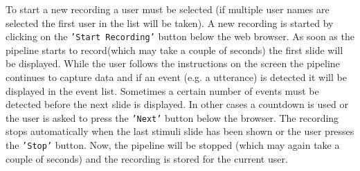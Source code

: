 To start a new recording a user must be selected (if multiple user names are selected the first user in the list will be taken). A new recording is started by clicking on the \texttt{'Start Recording'} button below the web browser. As soon as the pipeline starts to record(which may take a couple of seconds) the first slide will be displayed. While the user follows the instructions on the screen the pipeline continues to capture data and if an event (e.g. a utterance) is detected it will be displayed in the event list. Sometimes a certain number of events must be detected before the next slide is displayed. In other cases a countdown is used or the user is asked to press the \texttt{'Next'} button below the browser. The recording stops automatically when the last stimuli slide has been shown or the user presses the \texttt{'Stop'} button. Now, the pipeline will be stopped (which may again take a couple of seconds) and the recording is stored for the current user.

